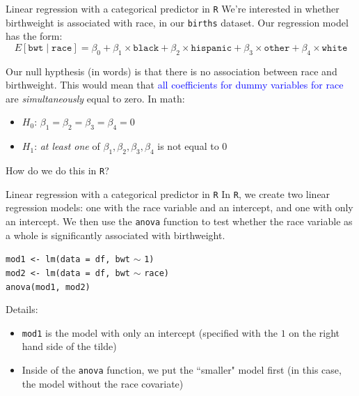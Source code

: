 \documentclass[10pt,t]{beamer}
\begin{document}
\begin{frame}{Linear regression with a categorical predictor in \texttt{R}}
We're interested in whether birthweight is associated with race, in our \texttt{births} dataset. Our regression model has the form:
$$
E[\texttt{bwt} \mid \texttt{race}] = \beta_0 + \beta_1 \times \texttt{black} + \beta_2 \times \texttt{hispanic} + \beta_3 \times \texttt{other} + \beta_4 \times \texttt{white}
$$ \pause

Our null hypthesis (in words) is that there is no association between race and birthweight. This would mean that \textcolor{blue}{all coefficients for dummy variables for race} are \textit{simultaneously} equal to zero. \pause In math:

\vspace{0.3cm}

\begin{itemize}
	\item $H_0$: $\beta_1 = \beta_2 = \beta_3 =\beta_4 =  0$
	\item $H_1$: \textit{at least one} of $\beta_1, \beta_2, \beta_3, \beta_4$ is not equal to $0$
\end{itemize} \pause

\vspace{0.3cm}

How do we do this in \texttt{R}?

\end{frame}

\begin{frame}{Linear regression with a categorical predictor in \texttt{R}}
In \texttt{R}, we create two linear regression models: one with the race variable and an intercept, and one with only an intercept. We then use the \texttt{anova} function to test whether the race variable as a whole is significantly associated with birthweight.

\vspace{0.3cm}

\texttt{mod1 <- lm(data = df, bwt} $\sim$ \texttt{1) \\
	mod2 <- lm(data = df, bwt} $\sim$ \texttt{race) \\
	anova(mod1, mod2)} \pause

\vspace{0.3cm}

Details:
\begin{itemize}
	\item \texttt{mod1} is the model with only an intercept (specified with the $1$ on the right hand side of the tilde)
	\item Inside of the \texttt{anova} function, we put the ``smaller" model first (in this case, the model without the race covariate)
\end{itemize}
\end{frame}
\end{document}
